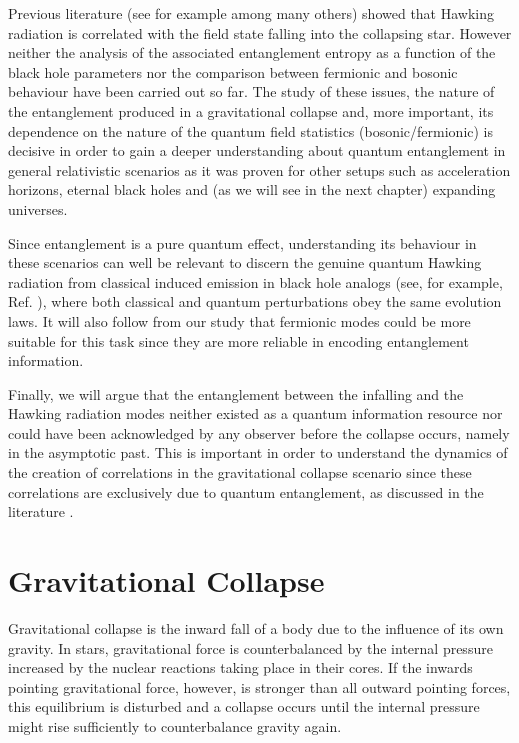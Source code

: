 Previous literature (see for example
\cite{Balbinot,NavarroSalas,BalbinotII,serena} among many others)
showed that Hawking radiation is correlated with the field state falling
into the collapsing star. However neither the analysis of the associated
entanglement entropy as a function of the black hole parameters nor the
comparison between fermionic and bosonic behaviour have been carried
out so far. The study of these issues,  the nature of the entanglement
produced in a gravitational collapse and, more important, its dependence
on the nature of the quantum field statistics (bosonic/fermionic)  is decisive in
order to gain a deeper understanding about quantum entanglement in
general relativistic scenarios as it was proven for other setups such as
acceleration horizons, eternal black holes and (as we will see in the next chapter) expanding universes.


Since entanglement is a pure quantum effect,  understanding its behaviour
in these scenarios can well be relevant to discern the genuine quantum
Hawking radiation from classical induced emission in black hole analogs
\cite{Unruhan} (see, for example, Ref. \cite{serena}), where both
classical and quantum perturbations obey the same evolution laws.  It will
also follow from our study  that fermionic modes could be more suitable
for this task since they are more reliable in encoding entanglement
information.

Finally,  we will argue that the entanglement between the infalling and the
Hawking radiation modes neither existed as a quantum information
resource nor could have  been acknowledged by any observer before the
collapse occurs, namely in the asymptotic past. This is important in order
to understand the dynamics of the creation of correlations in the
gravitational collapse scenario since these correlations are exclusively
due to quantum entanglement, as discussed in the literature
\cite{Balbinot,NavarroSalas,BalbinotII,serena}.

\section{Gravitational Collapse}

Gravitational collapse is the inward fall of a body due to the influence of its own gravity. In stars, gravitational force is counterbalanced by the internal pressure increased by the nuclear reactions taking place in their cores. If the inwards pointing gravitational force, however, is stronger than all outward pointing forces, this equilibrium is disturbed and a collapse occurs until the internal pressure might rise sufficiently to counterbalance gravity again.

